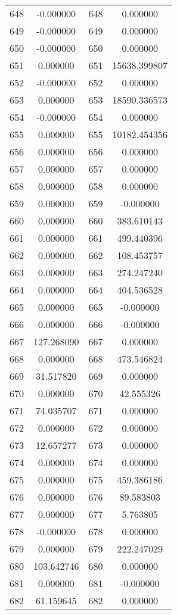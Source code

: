 \documentclass[12pt]{article}
\begin{document}
\begin{longtable}{@{}cccc@{}}
648 & -0.000000 & 648 & 0.000000 \\
649 & -0.000000 & 649 & 0.000000 \\
650 & -0.000000 & 650 & 0.000000 \\
651 & 0.000000 & 651 & 15638.399807 \\
652 & -0.000000 & 652 & 0.000000 \\
653 & 0.000000 & 653 & 18590.336573 \\
654 & -0.000000 & 654 & 0.000000 \\
655 & 0.000000 & 655 & 10182.454356 \\
656 & 0.000000 & 656 & 0.000000 \\
657 & 0.000000 & 657 & 0.000000 \\
658 & 0.000000 & 658 & 0.000000 \\
659 & 0.000000 & 659 & -0.000000 \\
660 & 0.000000 & 660 & 383.610143 \\
661 & 0.000000 & 661 & 499.440396 \\
662 & 0.000000 & 662 & 108.453757 \\
663 & 0.000000 & 663 & 274.247240 \\
664 & 0.000000 & 664 & 404.536528 \\
665 & 0.000000 & 665 & -0.000000 \\
666 & 0.000000 & 666 & -0.000000 \\
667 & 127.268090 & 667 & 0.000000 \\
668 & 0.000000 & 668 & 473.546824 \\
669 & 31.517820 & 669 & 0.000000 \\
670 & 0.000000 & 670 & 42.555326 \\
671 & 74.035707 & 671 & 0.000000 \\
672 & 0.000000 & 672 & 0.000000 \\
673 & 12.657277 & 673 & 0.000000 \\
674 & 0.000000 & 674 & 0.000000 \\
675 & 0.000000 & 675 & 459.386186 \\
676 & 0.000000 & 676 & 89.583803 \\
677 & 0.000000 & 677 & 5.763805 \\
678 & -0.000000 & 678 & 0.000000 \\
679 & 0.000000 & 679 & 222.247029 \\
680 & 103.642746 & 680 & 0.000000 \\
681 & 0.000000 & 681 & -0.000000 \\
682 & 61.159645 & 682 & 0.000000 \\

\end{longtable}
\end{document}
